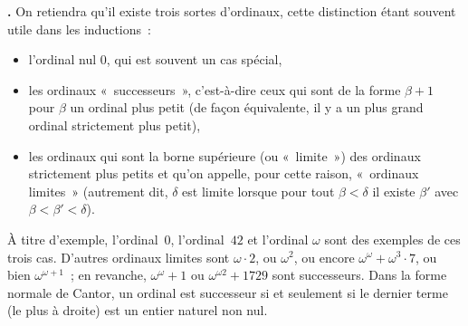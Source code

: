\documentclass[12pt,a4paper]{article}
\theoremstyle{definition}
\newcommand\thingy{%
\refstepcounter{comcnt}\smallskip\noindent\textbf{\thecomcnt.} }
\begin{document}
\thingy On retiendra qu'il existe trois sortes d'ordinaux, cette
distinction étant souvent utile dans les inductions :
\begin{itemize}
\item l'ordinal nul $0$, qui est souvent un cas spécial,
\item les ordinaux « successeurs », c'est-à-dire ceux qui sont de la
  forme $\beta+1$ pour $\beta$ un ordinal plus petit (de façon
  équivalente, il y a un plus grand ordinal strictement plus petit),
\item les ordinaux qui sont la borne supérieure (ou « limite ») des
  ordinaux strictement plus petits et qu'on appelle, pour cette
  raison, « ordinaux limites » (autrement dit, $\delta$ est limite
  lorsque pour tout $\beta<\delta$ il existe $\beta'$ avec
  $\beta<\beta'<\delta$).
\end{itemize}
À titre d'exemple, l'ordinal $0$, l'ordinal $42$ et l'ordinal $\omega$
sont des exemples de ces trois cas.  D'autres ordinaux limites sont
$\omega\cdot 2$, ou $\omega^2$, ou encore $\omega^\omega +
\omega^3\cdot 7$, ou bien $\omega^{\omega+1}$ ; en revanche,
$\omega^\omega + 1$ ou $\omega^{\omega 2} + 1729$ sont
successeurs.  Dans la forme normale de Cantor, un ordinal est
successeur si et seulement si le dernier terme (le plus à droite) est
un entier naturel non nul.
\end{document}
